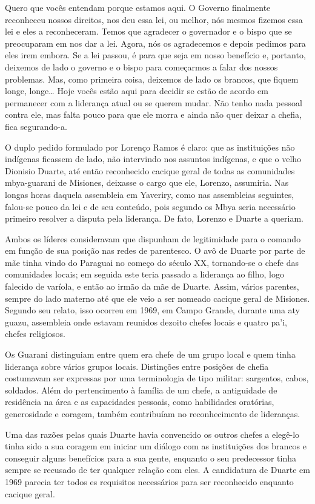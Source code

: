 Quero que vocês entendam porque estamos aqui. O Governo finalmente
reconheceu nossos direitos, nos deu essa lei, ou melhor, nós mesmos
fizemos essa lei e eles a reconheceram. Temos que agradecer o
governador e o bispo que se preocuparam em nos dar a lei. Agora, nós os
agradecemos e depois pedimos para eles irem embora. Se a lei passou, é
para que seja em nosso benefício e, portanto, deixemos de lado o
governo e o bispo para começarmos a falar dos nossos problemas. Mas,
como primeira coisa, deixemos de lado os brancos, que fiquem longe,
longe\ldots{} Hoje vocês estão aqui para decidir se estão de acordo em
permanecer com a liderança atual ou se querem mudar. Não tenho nada
pessoal contra ele, mas falta pouco para que ele morra e ainda não quer
deixar a chefia, fica segurando-a.

O duplo pedido formulado por Lorenço Ramos é claro: que as instituições
não indígenas ficassem de lado, não intervindo nos assuntos indígenas,
e que o velho Dionisio Duarte, até então reconhecido cacique geral de
todas as comunidades mbya-guarani de Misiones, deixasse o cargo que
ele, Lorenzo, assumiria. Nas longas horas daquela assembleia em
Yaveriry, como nas assembleias seguintes, falou-se pouco da lei e de
seu conteúdo, pois segundo os Mbya seria necessário primeiro resolver a
disputa pela liderança. De fato, Lorenzo e Duarte a queriam.

Ambos os líderes consideravam que dispunham de legitimidade para o
comando em função de sua posição nas redes de parentesco. O avô de
Duarte por parte de mãe tinha vindo do Paraguai no começo do século XX,
tornando-se o chefe das comunidades locais; em seguida este teria
passado a liderança ao filho, logo falecido de varíola, e então ao
irmão da mãe de Duarte. Assim, vários parentes, sempre do lado materno
até que ele veio a ser nomeado cacique geral de Misiones. Segundo seu
relato, isso ocorreu em 1969, em Campo Grande, durante uma aty guazu,
assembleia onde estavam reunidos dezoito chefes locais e quatro pa’i,
chefes religiosos. 

Os Guarani distinguiam entre quem era chefe de um grupo local e quem
tinha liderança sobre vários grupos locais. Distinções entre posições
de chefia costumavam ser expressas por uma terminologia de tipo
militar: sargentos, cabos, soldados. Além do pertencimento à família de
um chefe, a antiguidade de residência na área e as capacidades
pessoais, como habilidades oratórias, generosidade e coragem, também
contribuíam no reconhecimento de lideranças. 

Uma das razões pelas quais Duarte havia convencido os outros chefes a
elegê-lo tinha sido a sua coragem em iniciar um diálogo com as
instituições dos brancos e conseguir alguns benefícios para a sua
gente, enquanto o seu predecessor tinha sempre se recusado de ter
qualquer relação com eles. A candidatura de Duarte em 1969 parecia ter
todos es requisitos necessários para ser reconhecido enquanto cacique
geral.


